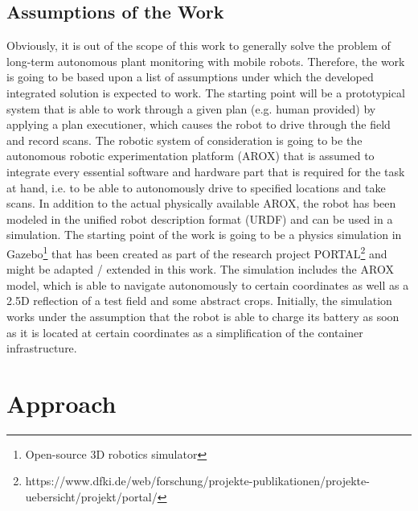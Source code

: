 \documentclass[german, master, expose, latin1]{base/thesis_KBS}
\begin{document}
\subsection{Assumptions of the Work}

Obviously, it is out of the scope of this work to generally solve the problem of long-term autonomous plant monitoring with mobile robots.
Therefore, the work is going to be based upon a list of assumptions under which the developed integrated solution is expected to work.
The starting point will be a prototypical system that is able to work through a given plan (e.g. human provided) by applying a plan executioner,
which causes the robot to drive through the field and record scans.
The robotic system of consideration is going to be the autonomous robotic experimentation platform (AROX) \cite{Kisliuk:2021} that is assumed to integrate every
essential software and hardware part that is required for the task at hand, i.e. to be able to autonomously drive to specified locations and take scans.
In addition to the actual physically available AROX, the robot has been modeled in the unified robot description format (URDF) and can be used in a simulation.
The starting point of the work is going to be a physics simulation in Gazebo\footnote{Open-source 3D robotics simulator} that has been created as part of the research project 
PORTAL\footnote{https://www.dfki.de/web/forschung/projekte-publikationen/projekte-uebersicht/projekt/portal/} and might be adapted / extended in this work.
The simulation includes the AROX model, which is able to navigate autonomously to certain coordinates as well as a 2.5D  reflection of a test field and some abstract crops.
Initially, the simulation works under the assumption that the robot is able to charge its battery as soon as it is located at certain coordinates as a simplification
of the container infrastructure.

\section{Approach}
\end{document}
